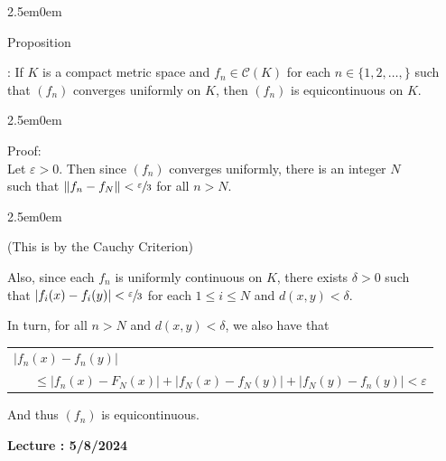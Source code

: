 \documentclass{book}
\newcommand{\hTwo}{%
   \color{MidnightBlue}%
   \fontsize{13}{15}\selectfont%
}
\newcommand{\hThree}{%
   \color{PineGreen!85!Orange}
   \fontsize{13}{15}\selectfont%
}
\newcommand{\hFour}{%
   \color{Cerulean}
   \fontsize{12}{14}\selectfont%
}
\newenvironment{myIndent}{%
   \begin{adjustwidth}{2.5em}{0em}%
}{%
   \end{adjustwidth}%
}
\newcounter{PropNumber}
\newcommand{\propCount}[1][1]{%
   \addtocounter{PropNumber}{#1}%
   \thePropNumber%
}
\newcommand{\retTwo}{\hfill\bigbreak}
\newcounter{LectureNumber}
\newcommand*{\markLecture}[1]{%
   \stepcounter{LectureNumber}%
   {\huge \color{Black} \textbf{Lecture \theLectureNumber: #1} \newline}%
}
\begin{document}
{\begin{myIndent}\hTwo
   Proposition \propCount: If $K$ is a compact metric space and $f_n \in \mathscr{C}(K)$ for each $n \in \{1,2,\ldots,\}$ such that $(f_n)$ converges uniformly on $K$, then $(f_n)$ is equicontinuous on $K$.

   \begin{myIndent}\hThree
      Proof:\\
      Let $\varepsilon > 0$. Then since $(f_n)$ converges uniformly, there is an integer $N$\\ such that $\|f_n - f_N\| < \sfrac{\varepsilon}{3}$ for all $n > N$.
      {\begin{myIndent}\hFour
         (This is by the Cauchy Criterion)
      \end{myIndent}}

      \newpage

      Also, since each $f_n$ is uniformly continuous on $K$, there exists $\delta > 0$ such\\ that $|f_i(x) - f_i(y)| < \sfrac{\varepsilon}{3}$ for each $1 \leq i \leq N$ and $d(x, y) < \delta$.\retTwo

      In turn, for all $n > N$ and $d(x, y) < \delta$, we also have that

      {\centering 
      \begin{tabular}{l}
         $|f_n(x) - f_n(y)|$\\ $\phantom{aaa} \leq |f_n(x) - F_N(x)| + |f_N(x) - f_N(y)| + |f_N(y) - f_n(y)| < \varepsilon$
      \end{tabular} \retTwo\par}

      And thus $(f_n)$ is equicontinuous.\retTwo
   \end{myIndent}
\end{myIndent}}

\markLecture{5/8/2024}
\end{document}
